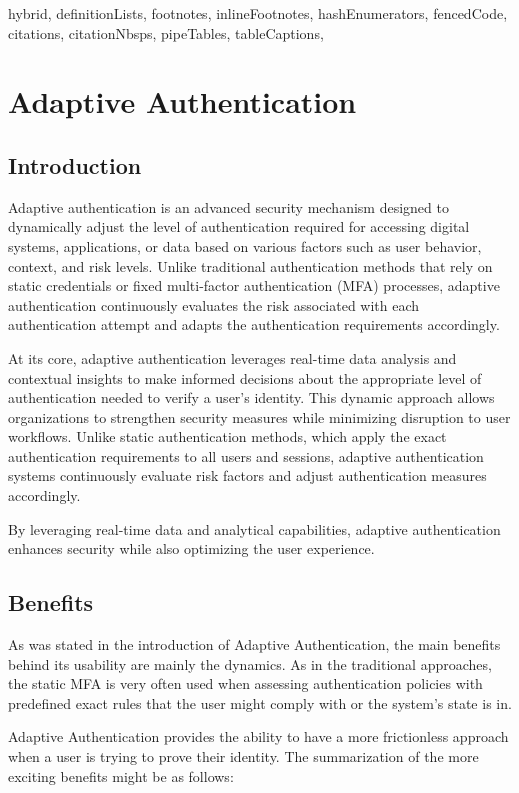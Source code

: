 \documentclass[
  digital,     %
  oneside,     %
  nosansbold,  %
  nocolorbold, %
  lof,         %
  lot,         %
]{fithesis4}
\begin{document}
\shorthandoff{-}
\begin{markdown*}{%
  hybrid,
  definitionLists,
  footnotes,
  inlineFootnotes,
  hashEnumerators,
  fencedCode,
  citations,
  citationNbsps,
  pipeTables,
  tableCaptions,
}
\chapter{Adaptive Authentication}
\section{Introduction}
Adaptive authentication is an advanced security mechanism designed to dynamically adjust the level of authentication required for accessing digital systems, applications, or data based on various factors such as user behavior, context, and risk levels.
Unlike traditional authentication methods that rely on static credentials or fixed multi-factor authentication (MFA) processes, adaptive authentication continuously evaluates the risk associated with each authentication attempt and adapts the authentication requirements accordingly.

At its core, adaptive authentication leverages real-time data analysis and contextual insights to make informed decisions about the appropriate level of authentication needed to verify a user's identity.
This dynamic approach allows organizations to strengthen security measures while minimizing disruption to user workflows.
Unlike static authentication methods, which apply the exact authentication requirements to all users and sessions, adaptive authentication systems continuously evaluate risk factors and adjust authentication measures accordingly.

By leveraging real-time data and analytical capabilities, adaptive authentication enhances security while also optimizing the user experience.\cite{intro-logintc}
\newpage
\section{Benefits}
As was stated in the introduction of Adaptive Authentication, the main benefits behind its usability are mainly the dynamics.
As in the traditional approaches, the static MFA is very often used when assessing authentication policies with predefined exact rules that the user might comply with or the system's state is in. 

Adaptive Authentication provides the ability to have a more frictionless approach when a user is trying to prove their identity.
\cite{intro-silverfort}\cite{intro-descope}
\newline
\newline
The summarization of the more exciting benefits might be as follows:


\end{markdown*}
\end{document}
